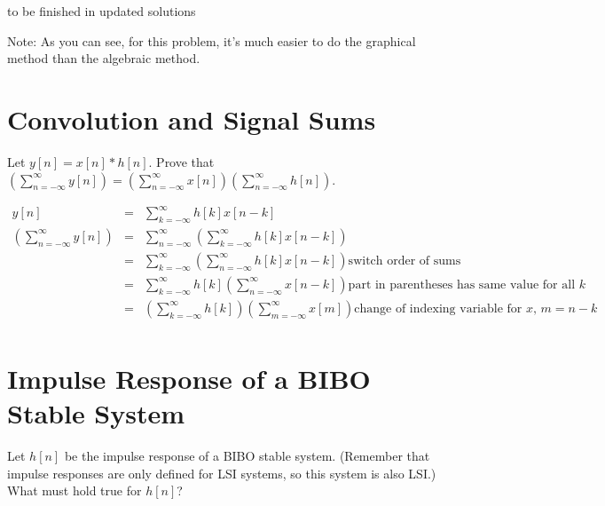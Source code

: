 \documentclass[11pt]{article}
\begin{document}
{to be finished in updated solutions

Note: As you can see, for this problem, it's much easier to do the graphical method than the algebraic method. 

}

\section{Convolution and Signal Sums}
Let $y[n] = x[n]*h[n]$. Prove that $\left( \sum\limits_{n=- \infty }^\infty y[n]\right) = \left(\sum\limits_{n=-\infty}^\infty x[n]\right)\left(\sum\limits_{n=-\infty}^\infty h[n]\right)$.

{\color{blue}
\begin{eqnarray*}
y[n] &=& \sum\limits_{k=-\infty}^\infty h[k]x[n-k] \\
\left(\sum\limits_{n=-\infty}^\infty y[n] \right) &=& \sum\limits_{n=-\infty}^\infty \left( \sum\limits_{k=-\infty}^\infty h[k]x[n-k] \right) \\
 &=& \sum\limits_{k=-\infty}^\infty \left( \sum\limits_{n=-\infty}^\infty h[k]x[n-k] \right) \text{switch order of sums} \\
&=& \sum\limits_{k=-\infty}^\infty h[k] \left(\sum\limits_{n=-\infty}^\infty x[n-k] \right) \text{part in parentheses has same value for all $k$}\\
&=& \left(\sum\limits_{k=-\infty}^\infty h[k]\right) \left(\sum\limits_{m=-\infty}^\infty x[m] \right) \text{change of indexing variable for $x$, $m=n-k$} \\
\end{eqnarray*}
}

\section{Impulse Response of a BIBO Stable System}
Let $h[n]$ be the impulse response of a BIBO stable system. (Remember that impulse responses are only defined for LSI systems, so this system is also LSI.) What must hold true for $h[n]$?
\end{document}
